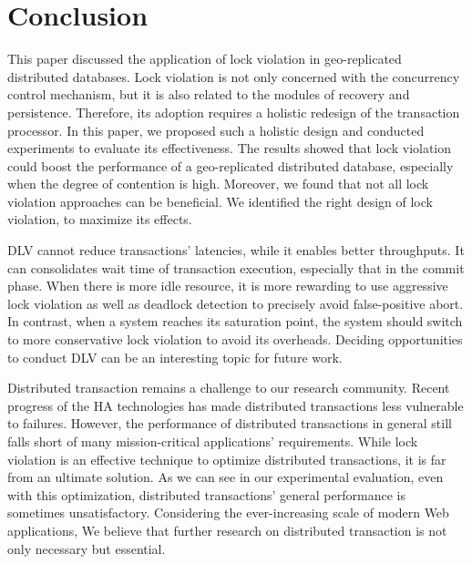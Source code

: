 \documentclass[conference]{IEEEtran}
\begin{document}
\section{Conclusion}
\label{sec:conclusion}

This paper discussed the application of lock violation in geo-replicated distributed databases.
Lock violation is not only concerned with the concurrency control mechanism, but it is also related to the modules of recovery and persistence.
Therefore, its adoption requires a holistic redesign of the transaction processor.
In this paper, we proposed such a holistic design and conducted experiments to evaluate its effectiveness.
The results showed that lock violation could boost the performance of a geo-replicated distributed database, especially when the degree of contention is high.
Moreover, we found that not all lock violation approaches can be beneficial. We identified the right design of lock violation, to maximize its effects.


DLV cannot reduce transactions' latencies, while it enables better throughputs.
It can consolidates wait time of transaction execution, especially that in the commit phase.
When there is more idle resource, it is more rewarding to use aggressive lock violation as well as deadlock detection to precisely avoid false-positive abort.
In contrast, when a system reaches its saturation point, the system should switch to more conservative
lock violation to avoid its overheads.
Deciding opportunities to conduct DLV can be an interesting topic for future work.



Distributed transaction remains a challenge to our research community. Recent progress of the HA technologies has made distributed transactions less vulnerable to failures.
However, the performance of distributed transactions in general still falls short of many mission-critical applications' requirements.
While lock violation is an effective technique to optimize distributed transactions, it is far from an ultimate solution.
As we can see in our experimental evaluation, even with this optimization, distributed transactions' general performance is sometimes unsatisfactory.
Considering the ever-increasing scale of modern Web applications, We believe that further research on distributed transaction is not only necessary but essential.





\end{document}
